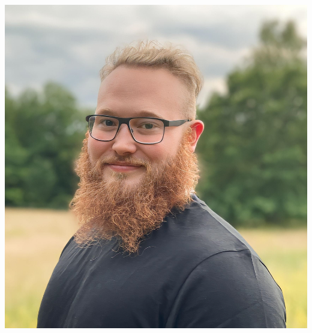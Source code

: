 \documentclass{article}
\begin{document}
\begin{minipage}[t]{0.28\textwidth}
\begin{minipage}[t]{0.8\textwidth}
\vspace{-10pt} %
  \includegraphics[width=\linewidth]{me.png}
  \label{fig:bild}
\end{minipage}

\end{minipage}
\end{document}
